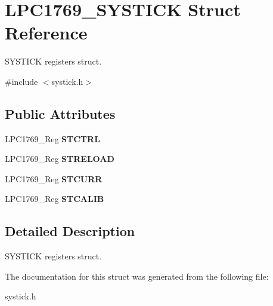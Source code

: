 \hypertarget{struct_l_p_c1769___s_y_s_t_i_c_k}{\section{L\+P\+C1769\+\_\+\+S\+Y\+S\+T\+I\+C\+K Struct Reference}
\label{struct_l_p_c1769___s_y_s_t_i_c_k}
}


S\+Y\+S\+T\+I\+C\+K registers struct.  




{\ttfamily \#include $<$systick.\+h$>$}

\subsection*{Public Attributes}
\begin{DoxyCompactItemize}
\item 
\hypertarget{struct_l_p_c1769___s_y_s_t_i_c_k_ac19578163d340120906beb4732199f8c}{L\+P\+C1769\+\_\+\+Reg {\bfseries S\+T\+C\+T\+R\+L}}\label{struct_l_p_c1769___s_y_s_t_i_c_k_ac19578163d340120906beb4732199f8c}

\item 
\hypertarget{struct_l_p_c1769___s_y_s_t_i_c_k_a2f17969d3e20fb43ea3106ab9692cec7}{L\+P\+C1769\+\_\+\+Reg {\bfseries S\+T\+R\+E\+L\+O\+A\+D}}\label{struct_l_p_c1769___s_y_s_t_i_c_k_a2f17969d3e20fb43ea3106ab9692cec7}

\item 
\hypertarget{struct_l_p_c1769___s_y_s_t_i_c_k_a636459c239e7f4177e2c243c01941732}{L\+P\+C1769\+\_\+\+Reg {\bfseries S\+T\+C\+U\+R\+R}}\label{struct_l_p_c1769___s_y_s_t_i_c_k_a636459c239e7f4177e2c243c01941732}

\item 
\hypertarget{struct_l_p_c1769___s_y_s_t_i_c_k_a09f56937b894b0b4204868bd0b3502d9}{L\+P\+C1769\+\_\+\+Reg {\bfseries S\+T\+C\+A\+L\+I\+B}}\label{struct_l_p_c1769___s_y_s_t_i_c_k_a09f56937b894b0b4204868bd0b3502d9}

\end{DoxyCompactItemize}


\subsection{Detailed Description}
S\+Y\+S\+T\+I\+C\+K registers struct. 

The documentation for this struct was generated from the following file\+:\begin{DoxyCompactItemize}
\item 
systick.\+h\end{DoxyCompactItemize}
